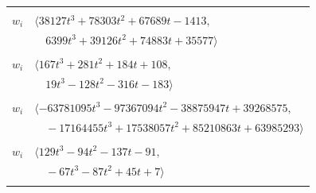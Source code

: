 \documentclass[11pt]{article}
\begin{document}
\begin{longtable}{@{}ll@{}}
\addlinespace[2pt]
\multicolumn{2}{@{}p{0.97\textwidth}@{}}{$i=28$, $D_i=16$, $\rho_{ij}$: $3{:}1, \allowbreak 11{:}1, \allowbreak 12{:}1, \allowbreak 15{:}2, \allowbreak 20{:}1, \allowbreak 22{:}1, \allowbreak 24{:}2, \allowbreak 31{:}2, \allowbreak 32{:}1, \allowbreak 33{:}1, \allowbreak 40{:}1, \allowbreak 47{:}1, \allowbreak 54{:}2, \allowbreak 55{:}1, \allowbreak 56{:}1, \allowbreak 61{:}2, \allowbreak 67{:}1$}\\
$w_i$ & $\langle 38127t^{3}+78303t^{2}+67689t-1413,$\\
 & $\quad 6399t^{3}+39126t^{2}+74883t+35577\rangle$\\
\addlinespace[2pt]
\multicolumn{2}{@{}p{0.97\textwidth}@{}}{$i=29$, $D_i=8$, $\rho_{ij}$: $3{:}1, \allowbreak 8{:}2, \allowbreak 9{:}2, \allowbreak 16{:}1, \allowbreak 26{:}2, \allowbreak 36{:}2, \allowbreak 43{:}2, \allowbreak 59{:}2, \allowbreak 64{:}1$}\\
$w_i$ & $\langle 167t^{3}+281t^{2}+184t+108,$\\
 & $\quad 19t^{3}-128t^{2}-316t-183\rangle$\\
\addlinespace[2pt]
\multicolumn{2}{@{}p{0.97\textwidth}@{}}{$i=30$, $D_i=64$, $\rho_{ij}$: $0{:}2, \allowbreak 3{:}1, \allowbreak 8{:}1, \allowbreak 11{:}2, \allowbreak 13{:}1, \allowbreak 16{:}2, \allowbreak 19{:}2, \allowbreak 20{:}2, \allowbreak 21{:}1, \allowbreak 22{:}1, \allowbreak 26{:}2, \allowbreak 32{:}1, \allowbreak 33{:}1, \allowbreak 40{:}1, \allowbreak 45{:}2, \allowbreak 49{:}1, \allowbreak 56{:}1, \allowbreak 59{:}1, \allowbreak 61{:}1, \allowbreak 63{:}1, \allowbreak 65{:}2, \allowbreak 66{:}1, \allowbreak 67{:}1$}\\
$w_i$ & $\langle -63781095t^{3}-97367094t^{2}-38875947t+39268575,$\\
 & $\quad -17164455t^{3}+17538057t^{2}+85210863t+63985293\rangle$\\
\addlinespace[2pt]
\multicolumn{2}{@{}p{0.97\textwidth}@{}}{$i=31$, $D_i=4$, $\rho_{ij}$: $5{:}2, \allowbreak 9{:}1, \allowbreak 10{:}2, \allowbreak 14{:}1, \allowbreak 16{:}2, \allowbreak 19{:}2, \allowbreak 25{:}2, \allowbreak 28{:}1, \allowbreak 34{:}2, \allowbreak 39{:}2, \allowbreak 53{:}1, \allowbreak 60{:}1, \allowbreak 62{:}2$}\\
$w_i$ & $\langle 129t^{3}-94t^{2}-137t-91,$\\
 & $\quad -67t^{3}-87t^{2}+45t+7\rangle$\\
\addlinespace[2pt]
\multicolumn{2}{@{}p{0.97\textwidth}@{}}{$i=32$, $D_i=8$, $\rho_{ij}$: $10{:}2, \allowbreak 14{:}1, \allowbreak 23{:}2, \allowbreak 28{:}2, \allowbreak 30{:}2, \allowbreak 33{:}2, \allowbreak 35{:}1, \allowbreak 39{:}2, \allowbreak 41{:}1, \allowbreak 60{:}1$}\\

\end{longtable}
\end{document}
